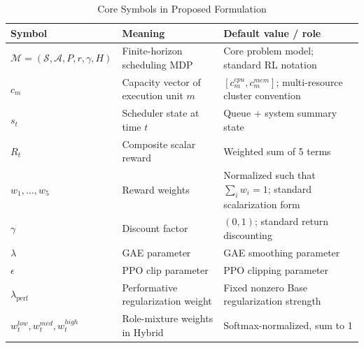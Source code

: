 \documentclass[journal]{IEEEtran}
\begin{document}
\begin{table}[t]
\centering
\caption{Core Symbols in Proposed Formulation}
\label{tab:symbols}
\small
\begin{tabular}{@{}p{3.5cm}p{4.9cm}p{9.5cm}@{}}
\toprule
\textbf{Symbol} & \textbf{Meaning} & \textbf{Default value / role} \\
\midrule
$\mathcal{M}=(\mathcal{S},\mathcal{A},P,r,\gamma,H)$ & Finite-horizon scheduling MDP & Core problem model; standard RL notation~\cite{sutton1998reinforcement} \\
$c_m$ & Capacity vector of execution unit $m$ & $[c_m^{cpu}, c_m^{mem}]$; multi-resource cluster convention~\cite{mao2016resource, ghodsi2011drf} \\
$s_t$ & Scheduler state at time $t$ & Queue + system summary state \\
$R_t$ & Composite scalar reward & Weighted sum of 5 terms \\
$w_1,\ldots,w_5$ & Reward weights & Normalized such that $\sum_i w_i = 1$; standard scalarization form~\cite{zhan2015survey} \\
$\gamma$ & Discount factor & $(0,1)$; standard return discounting~\cite{sutton1998reinforcement} \\
$\lambda$ & GAE parameter & GAE smoothing parameter~\cite{schulman2017proximal} \\
$\epsilon$ & PPO clip parameter & PPO clipping parameter~\cite{schulman2017proximal} \\
$\lambda_{\text{perf}}$ & Performative regularization weight & Fixed nonzero Base regularization strength~\cite{perdomo2020performative, mandal2023performative} \\
$w_t^{low},w_t^{med},w_t^{high}$ & Role-mixture weights in Hybrid & Softmax-normalized, sum to 1 \\
\bottomrule
\end{tabular}
\end{table}
\end{document}
